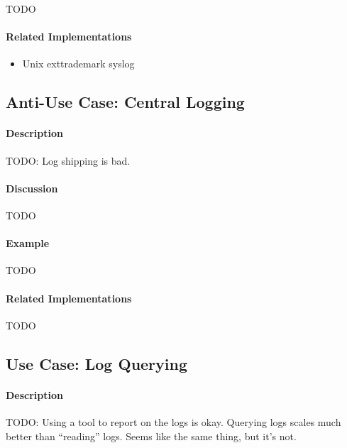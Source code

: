 {\Large TODO}

\paragraph{Related Implementations}

\begin{itemize}
        \item Unix        exttrademark syslog
\end{itemize}

\subsection{Anti-Use Case: Central Logging}

\paragraph{Description}

{\Large TODO:} Log shipping is bad.

\paragraph{Discussion}

{\Large TODO}

\paragraph{Example}

{\Large TODO}

\paragraph{Related Implementations}

{\Large TODO}

\subsection{Use Case: Log Querying}

\paragraph{Description}

{\Large TODO:} Using a tool to report on the logs is okay.  Querying logs scales much better than ``reading'' logs.  Seems like the same thing, but it's not.

